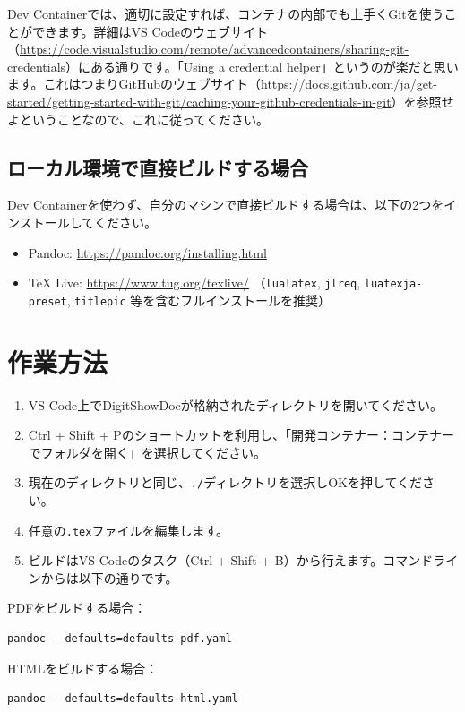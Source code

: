 Dev Containerでは、適切に設定すれば、コンテナの内部でも上手くGitを使うことができます。詳細はVS Codeのウェブサイト（\url{https://code.visualstudio.com/remote/advancedcontainers/sharing-git-credentials}）にある通りです。「Using a credential helper」というのが楽だと思います。これはつまりGitHubのウェブサイト（\url{https://docs.github.com/ja/get-started/getting-started-with-git/caching-your-github-credentials-in-git}）を参照せよということなので、これに従ってください。

\subsection{ローカル環境で直接ビルドする場合}
Dev Containerを使わず、自分のマシンで直接ビルドする場合は、以下の2つをインストールしてください。

\begin{itemize}
    \item Pandoc: \url{https://pandoc.org/installing.html}
    \item TeX Live: \url{https://www.tug.org/texlive/} （\texttt{lualatex}, \texttt{jlreq}, \texttt{luatexja-preset}, \texttt{titlepic} 等を含むフルインストールを推奨）
\end{itemize}

\section{作業方法}
\begin{enumerate}
    \item VS Code上でDigitShowDocが格納されたディレクトリを開いてください。
    \item Ctrl + Shift + Pのショートカットを利用し、「開発コンテナー：コンテナーでフォルダを開く」を選択してください。
    \item 現在のディレクトリと同じ、\texttt{./}ディレクトリを選択しOKを押してください。
    \item 任意の\texttt{.tex}ファイルを編集します。
    \item ビルドはVS Codeのタスク（Ctrl + Shift + B）から行えます。コマンドラインからは以下の通りです。
\end{enumerate}

PDFをビルドする場合：
\begin{lstlisting}[caption={PDFのビルドコマンド}]
pandoc --defaults=defaults-pdf.yaml
\end{lstlisting}

HTMLをビルドする場合：
\begin{lstlisting}[caption={HTMLのビルドコマンド}]
pandoc --defaults=defaults-html.yaml
\end{lstlisting}

